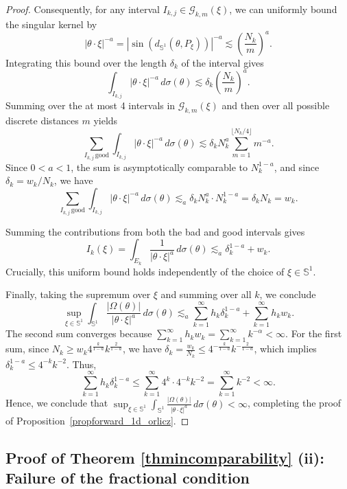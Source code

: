 \documentclass[11pt]{amsart}
\begin{document}
\begin{proof}
	Consequently, for any interval $I_{k,j} \in \mathcal{G}_{k,m}(\xi)$, we can uniformly bound the singular kernel by
	$$ |\theta \cdot \xi|^{-a} = |\sin(d_{\mathbb{S}^1}(\theta, P_\xi))|^{-a} \lesssim \left(\frac{N_k}{m}\right)^a.$$
	Integrating this bound over the length $\delta_k$ of the interval gives
	$$ \int_{I_{k,j}} |\theta \cdot \xi|^{-a} \, d\sigma(\theta) \lesssim \delta_k \left(\frac{N_k}{m}\right)^a. $$
	Summing over the at most 4 intervals in $\mathcal{G}_{k,m}(\xi)$ and then over all possible discrete distances $m$ yields
	$$ \sum_{I_{k,j} \, \text{good}} \int_{I_{k,j}} |\theta \cdot \xi|^{-a} \, d\sigma(\theta) \lesssim \delta_k N_k^a \sum_{m=1}^{\lfloor N_k/4 \rfloor} m^{-a}. $$
	Since $0 < a < 1$, the sum is asymptotically comparable to $N_k^{1-a}$, and since $\delta_k = w_k/N_k$, we have
	$$ \sum_{I_{k,j} \, \text{good}} \int_{I_{k,j}} |\theta \cdot \xi|^{-a} \, d\sigma(\theta) \lesssim_a \delta_k N_k^a \cdot N_k^{1-a} = \delta_k N_k = w_k. $$
	
	Summing the contributions from both the bad and good intervals gives
	$$ I_k(\xi) = \int_{E_k} \frac{1}{|\theta \cdot \xi|^a} \, d\sigma(\theta) \lesssim_a \delta_k^{1-a} + w_k. $$
	Crucially, this uniform bound holds independently of the choice of $\xi \in \mathbb{S}^1$.
	
	Finally, taking the supremum over $\xi$ and summing over all $k$, we conclude
	$$ \sup_{\xi \in \mathbb{S}^1} \int_{\mathbb{S}^1} \frac{|\Omega(\theta)|}{|\theta \cdot \xi|^a} \, d\sigma(\theta) \lesssim_a \sum_{k=1}^\infty h_k \delta_k^{1-a} + \sum_{k=1}^\infty h_k w_k. $$
	The second sum converges because $\sum_{k=1}^\infty h_k w_k = \sum_{k=1}^\infty k^{-\alpha} < \infty$. For the first sum, since $N_k \ge w_k 4^{\frac{k}{1-a}} k^{\frac{2}{1-a}}$, we have $\delta_k = \frac{w_k}{N_k} \le 4^{-\frac{k}{1-a}} k^{-\frac{2}{1-a}}$, which implies $\delta_k^{1-a} \le 4^{-k} k^{-2}$. Thus,
	$$ \sum_{k=1}^\infty h_k \delta_k^{1-a} \le \sum_{k=1}^\infty 4^k \cdot 4^{-k} k^{-2} = \sum_{k=1}^\infty k^{-2} < \infty. $$
	Hence, we conclude that $\sup_{\xi \in \mathbb{S}^1} \int_{\mathbb{S}^1} \frac{|\Omega(\theta)|}{|\theta \cdot \xi|^a} \, d\sigma(\theta) < \infty$, completing the proof of Proposition~\ref{propforward_1d_orlicz}.
\end{proof}

\subsection{Proof of Theorem \ref{thmincomparability} (ii): Failure of the fractional condition}
\end{document}
